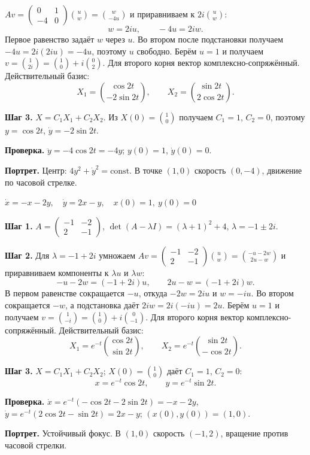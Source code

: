 \documentclass[12pt,a4paper]{article}
\newcommand{\col}[2]{\binom{#1}{#2}}
\newcommand{\mat}[4]{\begin{pmatrix}#1&#2\\#3&#4\end{pmatrix}}
\newcommand{\problem}[2]{\par\medskip\noindent\fbox{\bfseries #1}\quad #2\par}
\newcommand{\st}[1]{\par\medskip\noindent\textbf{#1}\quad}
\begin{document}
$Av=\mat{0}{1}{-4}{0}\col{u}{w}=\col{w}{-4u}$ и приравниваем к $2i\col{u}{w}$:
\[
w=2iu,\qquad -4u=2iw.
\]
Первое равенство задаёт $w$ через $u$. Во втором после подстановки получаем
$-4u=2i(2iu)=-4u$, поэтому $u$ свободно. Берём $u=1$ и получаем
$v=\col1{2i}=\col10+i\col02$. Для второго корня вектор комплексно-сопряжённый.
Действительный базис:
\[X_1=\col{\cos2t}{-2\sin2t},\qquad X_2=\col{\sin2t}{2\cos2t}.\]
\st{Шаг 3.} $X=C_1X_1+C_2X_2$. Из $X(0)=\col10$ получаем $C_1=1$, $C_2=0$, поэтому $y=\cos2t$, $\dot y=-2\sin2t$.
\st{Проверка.} $\ddot y=-4\cos2t=-4y$; $y(0)=1$, $\dot y(0)=0$.
\st{Портрет.} Центр: $4y^2+\dot y^2=\text{const}$. В точке $(1,0)$ скорость $(0,-4)$, движение по часовой стрелке.
\begin{center}\end{center}
\newpage
\problem{4}{$\dot x=-x-2y,\quad \dot y=2x-y,\quad x(0)=1,\ y(0)=0$}
\st{Шаг 1.} $A=\mat{-1}{-2}{2}{-1}$, $\det(A-\lambda I)=(\lambda+1)^2+4$, $\lambda=-1\pm2i$.
\st{Шаг 2.} Для $\lambda=-1+2i$ умножаем
$Av=\mat{-1}{-2}{2}{-1}\col{u}{w}=\col{-u-2w}{2u-w}$ и приравниваем
компоненты к $\lambda u$ и $\lambda w$:
\[
-u-2w=(-1+2i)u,\qquad 2u-w=(-1+2i)w.
\]
В первом равенстве сокращается $-u$, откуда $-2w=2iu$ и $w=-iu$.
Во втором сокращается $-w$, а подстановка даёт $2iw=2i(-iu)=2u$.
Берём $u=1$ и получаем $v=\col1{-i}=\col10+i\col0{-1}$.
Для второго корня вектор комплексно-сопряжённый. Действительный базис:
\[X_1=e^{-t}\col{\cos2t}{\sin2t},\qquad X_2=e^{-t}\col{\sin2t}{-\cos2t}.\]
\st{Шаг 3.} $X=C_1X_1+C_2X_2$; $X(0)=\col10$ даёт $C_1=1$, $C_2=0$:
\[x=e^{-t}\cos2t,\qquad y=e^{-t}\sin2t.\]
\st{Проверка.} $\dot x=e^{-t}(-\cos2t-2\sin2t)=-x-2y$, $\dot y=e^{-t}(2\cos2t-\sin2t)=2x-y$; $(x(0),y(0))=(1,0)$.
\st{Портрет.} Устойчивый фокус. В $(1,0)$ скорость $(-1,2)$, вращение против часовой стрелки.
\begin{center}\end{center}
\end{document}
